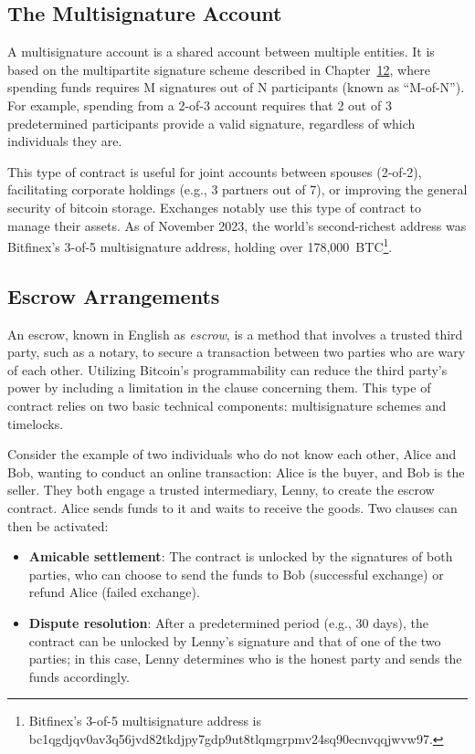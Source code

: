 \documentclass[
  a5paper,
  smalldemyvopaper,10pt,twoside,onecolumn,openright,extrafontsizes,hidelinks]{memoir}
\begin{document}
\subsection{The Multisignature
Account}\label{the-multisignature-account}

A multisignature account is a shared account between multiple entities.
It is based on the multipartite signature scheme described in
Chapter~\hyperref[ch:mechanics]{12}, where spending funds requires M
signatures out of N participants (known as ``M-of-N''). For example,
spending from a 2-of-3 account requires that 2 out of 3 predetermined
participants provide a valid signature, regardless of which individuals
they are.

This type of contract is useful for joint accounts between spouses
(2-of-2), facilitating corporate holdings (e.g., 3 partners out of 7),
or improving the general security of bitcoin storage. Exchanges notably
use this type of contract to manage their assets. As of November 2023,
the world's second-richest address was Bitfinex's 3-of-5 multisignature
address, holding over 178,000~BTC\footnote{Bitfinex's 3-of-5
  multisignature address is
  bc1qgdjqv0av3q56jvd82tkdjpy7gdp9ut8tlqmgrpmv24sq90ecnvqqjwvw97.}.

\subsection{Escrow Arrangements}\label{escrow-arrangements}

An escrow, known in English as \emph{escrow}, is a method that involves
a trusted third party, such as a notary, to secure a transaction between
two parties who are wary of each other. Utilizing Bitcoin's
programmability can reduce the third party's power by including a
limitation in the clause concerning them. This type of contract relies
on two basic technical components: multisignature schemes and timelocks.

Consider the example of two individuals who do not know each other,
Alice and Bob, wanting to conduct an online transaction: Alice is the
buyer, and Bob is the seller. They both engage a trusted intermediary,
Lenny, to create the escrow contract. Alice sends funds to it and waits
to receive the goods. Two clauses can then be activated:

\begin{itemize}
\item
  \textbf{Amicable settlement}: The contract is unlocked by the
  signatures of both parties, who can choose to send the funds to Bob
  (successful exchange) or refund Alice (failed exchange).
\item
  \textbf{Dispute resolution}: After a predetermined period (e.g., 30
  days), the contract can be unlocked by Lenny's signature and that of
  one of the two parties; in this case, Lenny determines who is the
  honest party and sends the funds accordingly.
\end{itemize}
\end{document}
